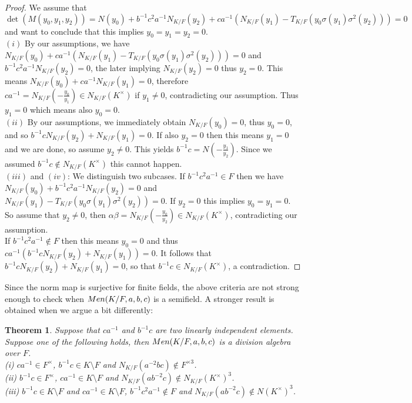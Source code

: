 \documentclass[11pt]{amsart}
\theoremstyle{plain}
\newtheorem{theorem}{Theorem}[section]
\theoremstyle{definition}
\begin{document}
  \begin{proof}
 We assume that
 $$\det (M(y_0, y_1, y_2))
 =N(y_0) + b^{-1}c^2 a^{-1}N_{K/F}(y_2)+ ca^{-1}(N_{K/F}(y_1)-T_{K/F}(y_0\sigma(y_1)\sigma^2(y_2)))=0$$
  and want to conclude that this implies $y_0=y_1=y_2=0$.
  \\ $(i)$  By our assumptions, we have $N_{K/F}(y_0) +  ca^{-1}(N_{K/F}(y_1)-T_{K/F}(y_0\sigma(y_1)\sigma^2(y_2)))=0$ and
  $b^{-1}c^2 a^{-1}N_{K/F}(y_2)=0$, the later implying $N_{K/F}(y_2)=0$ thus $y_2=0$. This means
  $N_{K/F}(y_0) +  ca^{-1}N_{K/F}(y_1)=0$, therefore $ca^{-1}=N_{K/F}(-\frac{y_0}{y_1})\in N_{K/F}(K^\times)$ if $y_1\not=0$, contradicting our assumption. Thus
  $y_1=0$ which means also $y_0=0$.
\\ $(ii)$ By our assumptions, we immediately obtain $N_{K/F}(y_0)=0$, thus $y_0=0$, and so $ b^{-1}c N_{K/F}(y_2)+ N_{K/F}(y_1)=0$.
If also $y_2=0$ then this means $y_1=0$ and we are done, so assume $y_2\not=0$. This yields $ b^{-1}c =N(-\frac{y_1}{y_2})$.
Since we assumed $b^{-1}c\not\in N_{K/F}(K^\times)$ this cannot happen.
\\ $(iii) $ and $(iv)$: We distinguish two subcases.
 If $b^{-1}c^2 a^{-1}\in F$ then we have $N_{K/F}(y_0)+  b^{-1}c^2 a^{-1}N_{K/F}(y_2)=0$ and $N_{K/F}(y_1)-T_{K/F}(y_0\sigma(y_1)\sigma^2(y_2))=0$.
If $y_2=0$ this implies $y_0=y_1=0$. So assume that $y_2\not=0$, then $\alpha \beta =N_{K/F}(-\frac{y_0}{y_2})\in N_{K/F}(K^\times)$, contradicting our assumption.
\\ If $b^{-1}c^2 a^{-1}\not \in F$ then this means $y_0=0$ and thus
$ca^{-1} ( b^{-1}cN_{K/F}(y_2)+ N_{K/F}(y_1))=0$. It follows that $b^{-1}cN_{K/F}(y_2)+ N_{K/F}(y_1)=0$, so that $b^{-1}c\in  N_{K/F}(K^\times)$, a contradiction.
\end{proof}

Since the norm map is surjective for finite fields, the above criteria are not strong enough to check when ${\rm Men}(K/F, a,b,c)$ is a semifield.
A stronger result is obtained when we argue a bit differently:

 \begin{theorem}\label{thm:div2}
  Suppose that $ca^{-1}$ and $b^{-1}c $ are two linearly independent elements. Suppose one of the following holds, then ${\rm Men}(K/F, a,b,c)$ is a division algebra over $F$.
  \\ (i)  $ca^{-1}\in F^\times$, $b^{-1}c \in K\setminus F $ and
   $N_{K/F}(a^{-2} bc)\not\in F^{ \times 3}$.
  \\ (ii)  $b^{-1}c\in F^\times$, $ca^{-1} \in K\setminus F$ and $ N_{K/F}(ab^{-2}c)\not\in N_{K/F}(K^\times)^3$.
  \\ (iii)  $b^{-1}c \in K\setminus F$ and $ca^{-1} \in K\setminus F$,
  $b^{-1}c^2 a^{-1}\not \in F$
  and $ N_{K/F}(ab^{-2}c)\not\in N(K^\times)^3$.
  \end{theorem}
\end{document}
